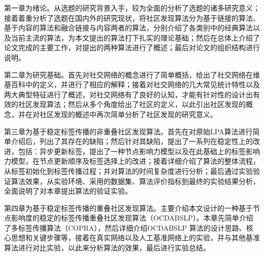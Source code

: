 第一章为绪论。从选题的研究背景入手，较为全面的分析了选题的诸多研究意义；接着着重分析了选题在国内外的研究现状，将社区发现算法分为基于链接的算法、基于内容的算法和融合链接与内容两者的算法，分别介绍了各类别中的经典算法以及当前主流的算法，为本文提出的算法打下扎实的理论基础；然后在总体上介绍了论文完成的主要工作，对提出的两种算法进行了概述；最后对论文的组织结构进行说明。

第二章为研究基础。首先对社交网络的概念进行了简单概括，给出了社交网络在维基百科中的定义，并进行了相应的解释；接着对社交网络的几大常见统计特性以及两大典型特征进行了概述，对社交网络有了良好的认知，才能有针对性的设计出有效的社区发现算法；然后从多个角度给出了社区的定义，以此引出社区发现的概念，并在对社区发现的概述中再次简单分析了社区发现的研究意义。

第三章为基于稳定标签传播的非重叠社区发现算法。首先在对原始LPA算法进行简单介绍后，列出了其存在的缺陷；然后针对其缺陷，提出了一系列在稳定性上的改进，包括：异步更新标签，提出了一种节点影响力模型以及在此基础上的标签影响力模型，在节点更新顺序及标签选择上的改进；接着详细介绍了算法的整体流程，从标签初始化到标签传播过程；并对算法的时间复杂度进行分析；最后通过实验验证算法效果，从实验环境、采用的数据集、算法评价指标到最终的实验结果分析，全面说明了对本章提出算法的验证实验。

第四章为基于稳定标签传播的重叠社区发现算法。主要介绍本文设计的一种基于节点影响度的稳定的标签传播重叠社区发现算法（OCDABSLP）。本章先简单介绍了多标签传播算法（COPRA），然后详细介绍OCDABSLP 算法的设计思路、核心思想和关键步骤等，接着在真实网络以及人工基准网络上的实验，并与其他基准算法进行对比实验，以此来分析算法的效果，最后进行实验总结。